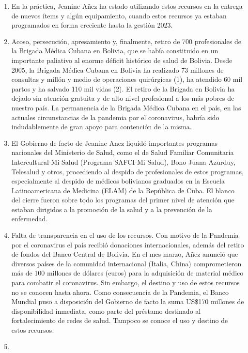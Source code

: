 \documentclass[a4paper, nobind]{templates/ociamthesis}
\begin{document}
\begin{enumerate}
\def\labelenumi{\arabic{enumi}.}
\setcounter{enumi}{2}
\item
  En la práctica, Jeanine Añez ha estado utilizando estos recursos en la entrega de nuevos ítems y algún equipamiento, cuando estos recursos ya estaban programados en forma creciente hasta la gestión 2023.
\item
  Acoso, persecución, apresamiento y, finalmente, retiro de 700 profesionales de la Brigada Médica Cubana en Bolivia, que se había constituido en un importante paliativo al enorme déficit histórico de salud de Bolivia. Desde 2005, la Brigada Médica Cubana en Bolivia ha realizado 73 millones de consultas y millón y medio de operaciones quirúrgicas (1), ha atendido 60 mil partos y ha salvado 110 mil vidas (2). El retiro de la Brigada en Bolivia ha dejado sin atención gratuita y de alto nivel profesional a los más pobres de nuestro país. La permanencia de la Brigada Médica Cubana en el país, en las actuales circunstancias de la pandemia por el coronavirus, habría sido indudablemente de gran apoyo para contención de la misma.
\item
  El Gobierno de facto de Jeanine Anez liquidó importantes programas nacionales del Ministerio de Salud, como el de Salud Familiar Comunitaria Intercultural-Mi Salud (Programa SAFCI-Mi Salud), Bono Juana Azurduy, Telesalud y otros, procediendo al despido de profesionales de estos programas, especialmente al despido de médicos bolivianos graduados en la Escuela Latinoamericana de Medicina (ELAM) de la República de Cuba. El blanco del cierre fueron sobre todo los programas del primer nivel de atención que estaban dirigidos a la promoción de la salud y a la prevención de la enfermedad.
\item
  Falta de transparencia en el uso de los recursos. Con motivo de la Pandemia por el coronavirus el país recibió donaciones internacionales, además del retiro de fondos del Banco Central de Bolivia. En el mes marzo, Añez anunció que diversos países de la comunidad internacional (Italia, China) comprometieron más de 100 millones de dólares (euros) para la adquisición de material médico para combatir el coronavirus. Sin embargo, el destino y uso de estos recursos no se conocen hasta ahora.
  Como consecuencia de la Pandemia, el Banco Mundial puso a disposición del Gobierno de facto la suma US\$170 millones de disponibilidad inmediata, como parte del préstamo destinado al fortalecimiento de redes de salud. Tampoco se conoce el uso y destino de estos recursos.
\item

\end{enumerate}
\end{document}
